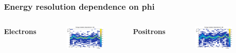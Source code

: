 \documentclass{beamer}
\begin{document}
	\begin{frame}
		\frametitle{Energy resolution dependence on phi}
		\begin{columns}
			\centering
			\Large \textbf{Electrons}
			\begin{figure}
				\centering
				\includegraphics[width = 0.95 \linewidth]{../images/e_deltaenergy_phi_all.png}
			\end{figure}
			\centering
			\Large \textbf{Positrons}
			\begin{figure}
				\centering
				\includegraphics[width = 0.95 \linewidth]{../images/p_deltaenergy_phi_all.png}
			\end{figure}
		\end{columns}
	\end{frame}
\end{document}
